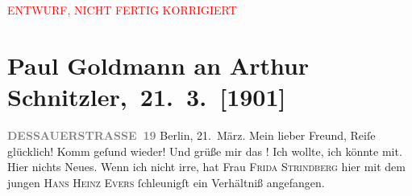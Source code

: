 
\begin{center}
            \textcolor{red}{ENTWURF, NICHT FERTIG KORRIGIERT}
                      \end{center}
            
         
         \renewcommand{\erwaehntePersonen}{Personen: Hanns Heinz Ewers, Hugo von Hofmannsthal, Dora Michaelis, Olga Schnitzler, Elisabeth Steinrück, Frida Strindberg, Irene Triesch, Jakob Wassermann}
         \renewcommand{\erwaehnteOrte}{Orte: Berlin, Dessauer Straße, Grünentorgasse, Italien, Welsberg-Taisten, Wien}
         \renewcommand{\erwaehnteWerke}{Werke: Tagebuch}
               \section[ Paul Goldmann an Arthur Schnitzler, 21. 3. {[}1901{]}]{ Paul Goldmann an Arthur Schnitzler, 21. 3. {[}1901{]}}\nopagebreak{}\rehead{ }\begin{ledgroupsized}[t]{13cm}\normalsize\beginnumbering \toendnotes[C]{\smallbreak\pagebreak[2]} 
\toendnotes[C]{\smallbreak}\pstart
           \noindent{}\raggedleft{}{\pb}\textcolor{gray}{\textbf{DESSAUERSTRASSE 19}}\pend
           \pstart
           Berlin, 21. März.\pend
           \pstart\center{}Mein lieber Freund,\pend\pstart
           Reiſe glücklich! Komm geſund wieder! Und grüße mir das \label{K_L03062-1v}\label{K_L03062-1h}! Ich wollte, ich könnte mit.\pend
           \pstart
           Hier nichts Neues. Wenn ich nicht irre, hat Frau \textsc{Frida Strindberg}{ }hier mit dem jungen \textsc{Hans Heinz Evers} ſchleunigſt ein Verhältniß angefangen.\pend

\end{ledgroupsized}
